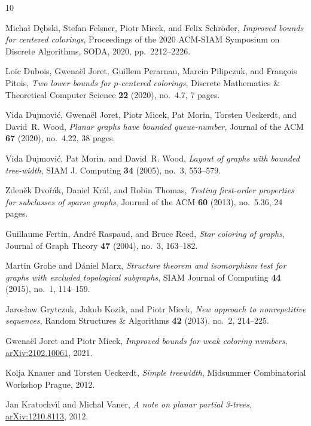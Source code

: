  
\begin{thebibliography}{10}

Michał D\k{e}bski, Stefan Felsner, Piotr Micek, and Felix Schröder,
  \emph{Improved bounds for centered colorings}, Proceedings of the 2020
  ACM-SIAM Symposium on Discrete Algorithms, SODA, 2020, pp.~2212--2226.

Loïc Dubois, Gwenaël Joret, Guillem Perarnau, Marcin Pilipczuk, and François
  Pitois, \emph{{Two lower bounds for $p$-centered colorings}}, {Discrete
  Mathematics \& Theoretical Computer Science} \textbf{22} (2020), no.~4.7, 7
  pages.

Vida Dujmovi\'{c}, Gwena\"{e}l Joret, Piotr Micek, Pat Morin, Torsten Ueckerdt,
  and David~R. Wood, \emph{Planar graphs have bounded queue-number}, Journal of
  the ACM \textbf{67} (2020), no.~4.22, 38 pages.

Vida Dujmovi\'{c}, Pat Morin, and David~R. Wood, \emph{Layout of graphs with
  bounded tree-width}, SIAM J. Computing \textbf{34} (2005), no.~3, 553--579.

Zden\v{e}k Dvo\v{r}\'{a}k, Daniel Kr\'{a}l, and Robin Thomas, \emph{Testing
  first-order properties for subclasses of sparse graphs}, Journal of the ACM
  \textbf{60} (2013), no.~5.36, 24 pages.

Guillaume Fertin, André Raspaud, and Bruce Reed, \emph{Star coloring of
  graphs}, Journal of Graph Theory \textbf{47} (2004), no.~3, 163--182.

Martin Grohe and D\'{a}niel Marx, \emph{Structure theorem and isomorphism test
  for graphs with excluded topological subgraphs}, SIAM Journal of Computing
  \textbf{44} (2015), no.~1, 114--159.

Jarosław Grytczuk, Jakub Kozik, and Piotr Micek, \emph{New approach to
  nonrepetitive sequences}, Random Structures \& Algorithms \textbf{42} (2013),
  no.~2, 214--225.

Gwena{\"{e}}l Joret and Piotr Micek, \emph{Improved bounds for weak coloring
  numbers}, \href{https://arxiv.org/abs/2102.10061}{arXiv:2102.10061}, 2021.

Kolja Knauer and Torsten Ueckerdt, \emph{Simple treewidth}, {M}idsummer
  {C}ombinatorial {W}orkshop {Prague}, 2012.

Jan Kratochv{\'{\i}}l and Michal Vaner, \emph{A note on planar partial
  3-trees}, \href{https://arxiv.org/abs/1210.8113}{arXiv:1210.8113}, 2012.


\end{thebibliography}
